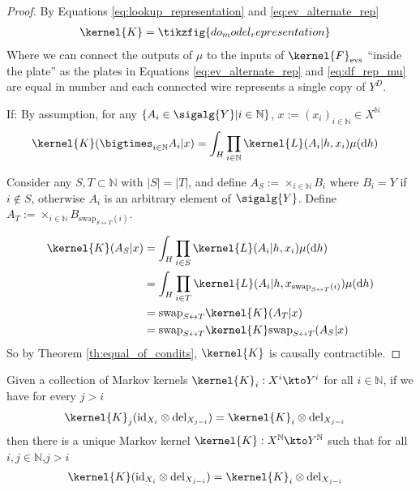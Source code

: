\begin{proof}
By Equations \ref{eq:lookup_representation} and \ref{eq:ev_alternate_rep}
\begin{align}
	\kernel{K} &= \tikzfig{do_model_representation}\label{eq:lup_rep_combined}
\end{align}
Where we can connect the outputs of $\mu$ to the inputs of $\kernel{F}_{\mathrm{evs}}$ ``inside the plate'' as the plates in Equations \ref{eq:ev_alternate_rep} and \ref{eq:df_rep_mu} are equal in number and each connected wire represents a single copy of $Y^D$.

If:
By assumption, for any $\{A_i\in \sigalg{Y}|i\in\mathbb{N}\}$, $x:=(x_i)_{i\in\mathbb{N}}\in X^{\mathbb{N}}$
\begin{align}
    \kernel{K}(\bigtimes_{i\in \mathbb{N}} A_i|x) &= \int_H \prod_{i\in \mathbb{N}}\kernel{L}(A_i|h,x_i)\mu(\mathrm{d}h)
\end{align}

Consider any $S,T\subset\mathbb{N}$ with $|S|=|T|$, and define $A_S:=\times_{i\in\mathbb{N}} B_i$ where $B_i=Y$ if $i\not\in S$, otherwise $A_i$ is an arbitrary element of $\sigalg{Y}$. Define $A_T:=\times_{i\in\mathbb{N}} B_{\mathrm{swap}_{S\leftrightarrow T}(i)}$.

\begin{align}
    \kernel{K}(A_S|x) &= \int_H \prod_{i\in S}\kernel{L}(A_i|h,x_i)\mu(\mathrm{d}h)\\
                  	  &= \int_H\prod_{i\in T}\kernel{L}(A_i|h,x_{\mathrm{swap}_{S\leftrightarrow T}(i)})\mu(\mathrm{d}h)\\
                      &= \mathrm{swap}_{S\leftrightarrow T}\kernel{K}(A_T|x)\\
                      &= \mathrm{swap}_{S\leftrightarrow T}\kernel{K}\mathrm{swap}_{S\leftrightarrow T}(A_S|x)
\end{align}
So by Theorem \ref{th:equal_of_condits}, $\kernel{K}$ is causally contractible.
\end{proof}

\begin{lemma}\label{lem:infinitely_extended_kernels}
Given a collection of Markov kernels $\kernel{K}_i:X^i\kto Y^i$ for all $i\in \mathbb{N}$, if we have for every $j>i$
\begin{align}
	\kernel{K}_j(\text{id}_{X_i}\otimes \text{del}_{X_{j-i}}) &= \kernel{K}_i\otimes \text{del}_{X_{j-i}}\label{eq:marginalise_comb}
\end{align} 
then there is a unique Markov kernel $\kernel{K}:X^{\mathbb{N}}\kto Y^{\mathbb{N}}$ such that for all $i,j\in \mathbb{N}$,$j>i$
\begin{align}
	\kernel{K}(\text{id}_{X_i}\otimes \text{del}_{X_{j-i}})&= \kernel{K}_i\otimes \text{del}_{X_{j-i}}
\end{align}
\end{lemma}

